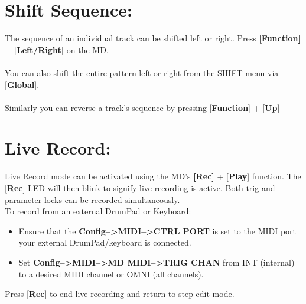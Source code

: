 \section{Shift Sequence:}
The sequence of an individual track can be shifted left or right. Press \textbf{[Function]} + \textbf{[Left/Right]} on the MD. \\\\You can also shift the entire pattern left or right from the SHIFT menu via [\textbf{Global}].\\\\
Similarly you can reverse a track's sequence by pressing [\textbf{Function}] + [\textbf{Up}]
\section{Live Record:}
Live Record mode can be activated using the MD's \textbf{[Rec]} + [\textbf{Play}] function.  The [\textbf{Rec}] LED will then blink to signify live recording is active. Both trig and parameter locks can be recorded simultaneously.\\
To record from an external DrumPad or Keyboard:
\begin{itemize}
    \item Ensure that the \textbf{Config-->MIDI-->CTRL PORT} is set to the MIDI port your external DrumPad/keyboard is connected.
    \item Set \textbf{Config-->MIDI-->MD MIDI-->TRIG CHAN} from INT (internal) to a desired MIDI channel or OMNI (all channels).
\end{itemize}
Press [\textbf{Rec}] to end live recording and return to step edit mode.

\newpage